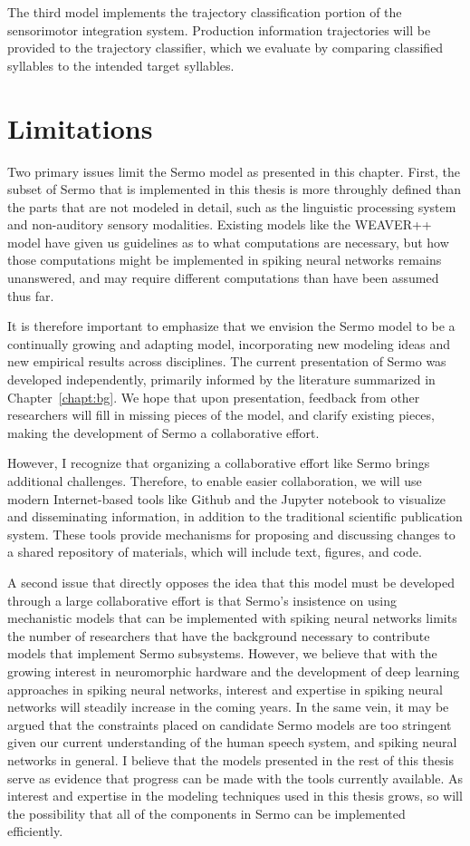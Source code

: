 The third model implements
the trajectory classification portion
of the sensorimotor integration system.
Production information trajectories
will be provided to the trajectory classifier,
which we evaluate by
comparing classified syllables
to the intended target syllables.

\section{Limitations}

Two primary issues limit the Sermo model
as presented in this chapter.
First, the subset of Sermo
that is implemented in this thesis
is more throughly defined than
the parts that are not modeled in detail,
such as the linguistic processing system
and non-auditory sensory modalities.
Existing models like the WEAVER++ model
have given us guidelines as to
what computations are necessary,
but how those computations might be implemented
in spiking neural networks
remains unanswered,
and may require different computations
than have been assumed thus far.

It is therefore important to emphasize
that we envision the Sermo model
to be a continually growing and adapting model,
incorporating new modeling ideas
and new empirical results
across disciplines.
The current presentation of Sermo
was developed independently,
primarily informed by the literature
summarized in Chapter~\ref{chapt:bg}.
We hope that upon presentation,
feedback from other researchers will
fill in missing pieces of the model,
and clarify existing pieces,
making the development of Sermo
a collaborative effort.

However, I recognize that
organizing a collaborative effort
like Sermo brings additional challenges.
Therefore, to enable easier collaboration,
we will use modern Internet-based tools
like Github and the Jupyter notebook
to visualize
and disseminating information,
in addition to the traditional
scientific publication system.
These tools provide mechanisms
for proposing and discussing changes
to a shared repository of materials,
which will include text, figures, and code.

A second issue that directly opposes
the idea that this model must be
developed through a large collaborative effort
is that Sermo's insistence on
using mechanistic models that
can be implemented with spiking neural networks
limits the number of researchers
that have the background necessary
to contribute models that implement
Sermo subsystems.
However, we believe that with the growing
interest in neuromorphic hardware
and the development of deep learning approaches
in spiking neural networks,
interest and expertise in spiking neural networks
will steadily increase in the coming years.
In the same vein, it may be argued that
the constraints placed on candidate Sermo models
are too stringent given our current understanding
of the human speech system,
and spiking neural networks in general.
I believe that the models presented
in the rest of this thesis
serve as evidence that
progress can be made with
the tools currently available.
As interest and expertise in
the modeling techniques used
in this thesis grows,
so will the possibility
that all of the components in Sermo
can be implemented efficiently.
